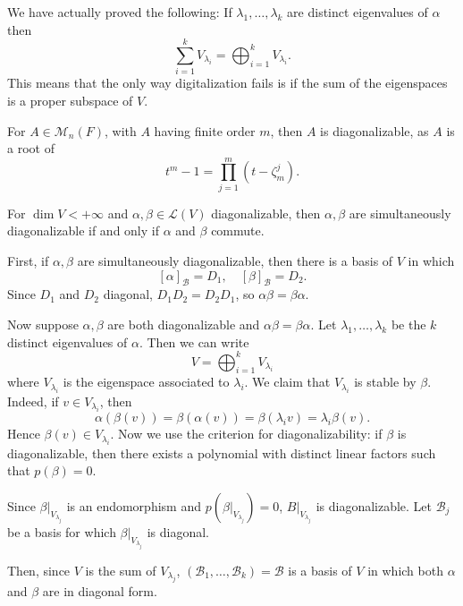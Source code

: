 \documentclass[12pt]{article}
\begin{document}
\begin{remark}
	We have actually proved the following: If $\lambda_1, \ldots, \lambda_k$ are distinct eigenvalues of $\alpha$ then
	\[
	\sum_{i = 1}^{k}V_{\lambda_i} = \bigoplus_{i = 1}^{k} V_{\lambda_i}
	.\]
	This means that the only way digitalization fails is if the sum of the eigenspaces is a proper subspace of $V$.
\end{remark}

\begin{exbox}
	For $A \in \mathcal{M}_n(F)$, with $A$ having finite order $m$, then $A$ is diagonalizable, as $A$ is a root of
	\[
		t^{m}- 1 = \prod_{j = 1}^{m}(t - \zeta_m^{j})
	.\]
\end{exbox}

\begin{theorem}
	For $\dim V < +\infty$ and $\alpha, \beta \in \mathcal{L}(V)$ diagonalizable, then $\alpha, \beta$ are simultaneously diagonalizable if and only if $\alpha$ and $\beta$ commute.
\end{theorem}

\begin{proofbox}
	First, if $\alpha, \beta$ are simultaneously diagonalizable, then there is a basis of $V$ in which
	\[
		[\alpha]_{\mathcal{B}} = D_1, \quad [\beta]_{\mathcal{B}} = D_2
	.\]
	Since $D_1$ and $D_2$ diagonal, $D_1D_2 = D_2D_1$, so $\alpha \beta = \beta \alpha$.

	Now suppose $\alpha, \beta$ are both diagonalizable and $\alpha \beta = \beta \alpha$. Let $\lambda_1, \ldots, \lambda_k$ be the $k$ distinct eigenvalues of $\alpha$. Then we can write
	\[
	V = \bigoplus_{i = 1}^{k} V_{\lambda_i}
	\]
	where $V_{\lambda_i}$ is the eigenspace associated to $\lambda_i$. We claim that $V_{\lambda_i}$ is stable by $\beta$. Indeed, if $v \in V_{\lambda_i}$, then
	\[
		\alpha (\beta(v)) = \beta (\alpha(v)) = \beta (\lambda_i v) = \lambda_i \beta(v)
	.\]
	Hence $\beta(v) \in V_{\lambda_i}$. Now we use the criterion for diagonalizability: if $\beta$ is diagonalizable, then there exists a polynomial with distinct linear factors such that $p(\beta) = 0$.

	Since $\beta|_{V_{\lambda_j}}$ is an endomorphism and $p(\beta|_{V_{\lambda_j}}) = 0$, $B|_{V_{\lambda_j}}$ is diagonalizable. Let $\mathcal{B}_j$ be a basis for which $\beta|_{V_{\lambda_j}}$ is diagonal.

	Then, since $V$ is the sum of $V_{\lambda_j}$, $(\mathcal{B}_1 , \ldots, \mathcal{B}_k) = \mathcal{B}$ is a basis of $V$ in which both $\alpha$ and $\beta$ are in diagonal form.
\end{proofbox}
\end{document}
